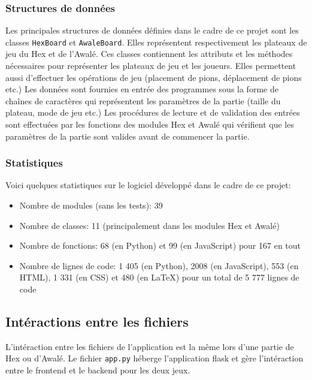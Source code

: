 \subsubsection{Structures de données}
Les principales structures de données définies dans le cadre de ce projet sont les classes
\texttt{HexBoard} et \texttt{AwaleBoard}. Elles représentent respectivement les plateaux de jeu du Hex et de
l'Awalé. Ces classes contiennent les attributs et les méthodes nécessaires
pour représenter les plateaux de jeu et les joueurs. Elles permettent aussi d'effectuer les opérations de jeu
(placement de pions, déplacement de pions etc.) Les données sont fournies en entrée des programmes
sous la forme de chaînes de caractères qui représentent les paramètres de la partie (taille du
plateau, mode de jeu etc.) Les procédures de lecture et de validation
des entrées sont effectuées par les fonctions des modules Hex et Awalé qui vérifient que les
paramètres de la partie sont valides avant de commencer la partie.

\subsubsection{Statistiques}
Voici quelques statistiques sur le logiciel développé dans le cadre de ce projet:
\begin{itemize}
    \item Nombre de modules (sans les tests): 39
    \item Nombre de classes: 11 (principalement dans les modules Hex et Awalé)
    \item Nombre de fonctions: 68 (en Python) et 99 (en JavaScript) pour 167 en tout
    \item Nombre de lignes de code: 1 405 (en Python), 2008 (en JavaScript), 553 (en HTML), 1 331 (en CSS)
    et 480 (en \LaTeX) pour un total de 5 777 lignes de code
\end{itemize}

\subsection{Intéractions entre les fichiers}
L'intéraction entre les fichiers de l'application est la même lors d'une partie de Hex ou 
d'Awalé. Le fichier \texttt{app.py} héberge l'application flask et gère l'intéraction entre le frontend et le 
backend pour les deux jeux.

